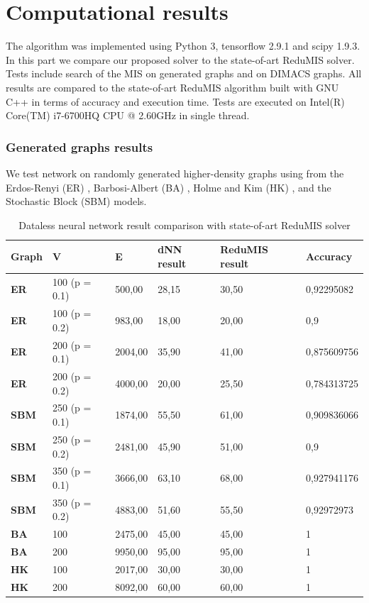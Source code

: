 \chapter{Computational results}
The algorithm was implemented using Python 3, tensorflow 2.9.1 and scipy 1.9.3. In this part we compare our proposed solver to the state-of-art ReduMIS solver.
Tests include search of the MIS on generated graphs and on DIMACS graphs. All results are compared to the state-of-art ReduMIS algorithm built with GNU C++ in terms of accuracy and execution time. Tests are executed on Intel(R) Core(TM) i7-6700HQ CPU @ 2.60GHz in single thread.

\subsection{Generated graphs results}
We test network on randomly generated higher-density graphs using from the Erdos-Renyi (ER) \cite{er60}, Barbosi-Albert (BA) \cite{ab02}, Holme and Kim (HK) \cite{hk02}, and the Stochastic Block (SBM) \cite{hll83} models.

\begin{table}[!ht]
    \centering
    \begin{tabular}{|l|l|l|l|l|l|}
    \hline
        \textbf{Graph} & \textbf{V} & \textbf{E} & \textbf{dNN result} & \textbf{ReduMIS result} & \textbf{Accuracy} \\ \hline
        \textbf{ER} & 100 (p = 0.1) & 500,00 & 28,15 & 30,50 & 0,92295082 \\ \hline
        \textbf{ER} & 100  (p = 0.2) & 983,00 & 18,00 & 20,00 & 0,9 \\ \hline
        \textbf{ER} & 200  (p = 0.1) & 2004,00 & 35,90 & 41,00 & 0,875609756 \\ \hline
        \textbf{ER} & 200  (p = 0.2) & 4000,00 & 20,00 & 25,50 & 0,784313725 \\ \hline
        \textbf{SBM} & 250  (p = 0.1) & 1874,00 & 55,50 & 61,00 & 0,909836066 \\ \hline
        \textbf{SBM} & 250  (p = 0.2) & 2481,00 & 45,90 & 51,00 & 0,9 \\ \hline
        \textbf{SBM} & 350  (p = 0.1) & 3666,00 & 63,10 & 68,00 & 0,927941176 \\ \hline
        \textbf{SBM} & 350  (p = 0.2) & 4883,00 & 51,60 & 55,50 & 0,92972973 \\ \hline
        \textbf{BA} & 100 & 2475,00 & 45,00 & 45,00 & 1 \\ \hline
        \textbf{BA} & 200 & 9950,00 & 95,00 & 95,00 & 1 \\ \hline
        \textbf{HK} & 100 & 2017,00 & 30,00 & 30,00 & 1 \\ \hline
        \textbf{HK} & 200 & 8092,00 & 60,00 & 60,00 & 1 \\ \hline
    \end{tabular}
    \caption{Dataless neural network result comparison with state-of-art ReduMIS solver}
    \label{table:generated_graphs_result}
\end{table}

